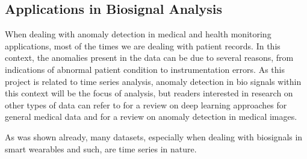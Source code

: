 \documentclass[../main.tex]{subfiles}
\begin{document}
    \subsection{Applications in Biosignal Analysis}
        When dealing with anomaly detection in medical and health monitoring applications, most of the times we are dealing with patient records. In this context, the anomalies present in the data can be due to several reasons, from indications of abnormal patient condition to instrumentation errors. As this project is related to time series analysis, anomaly detection in bio signals within this context will be the focus of analysis, but readers interested in research on other types of data can refer to \cite{fernando2021deep} for a review on deep learning approaches for general medical data and \cite{taboada2009images} for a review on anomaly detection in medical images. \par

        As was shown already, many datasets, especially when dealing with biosignals in smart wearables and such, are time series in nature.
\end{document}
